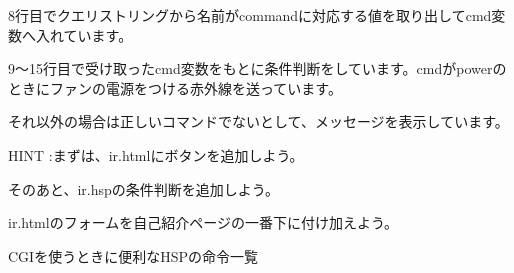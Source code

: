 \documentclass[text06.tex]{subfiles}
\begin{document}
\bigskip

8行目でクエリストリングから名前がcommandに対応する値を取り出してcmd変数へ入れています。

9〜15行目で受け取ったcmd変数をもとに条件判断をしています。cmdがpowerのときにファンの電源をつける赤外線を送っています。

それ以外の場合は正しいコマンドでないとして、メッセージを表示しています。


\begin{tcolorbox}[title=\useOmetoi,breakable]\label{Q:IR}
  \begin{enumerate}
  \end{enumerate}
    HINT :まずは、ir.htmlにボタンを追加しよう。

    そのあと、ir.hspの条件判断を追加しよう。

    ir.htmlのフォームを自己紹介ページの一番下に付け加えよう。
\end{tcolorbox}





\clearpage

\label{P:gpio}
CGIを使うときに便利なHSPの命令一覧
\end{document}

